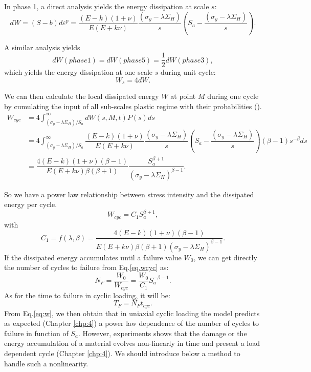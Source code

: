 In phase 1, a direct analysis yields the energy dissipation at scale $s$:
\begin{equation}dW=(S-b)d\varepsilon^p=\dfrac{(E-k)(1+\nu) }{E(E+k\nu)}\dfrac{ \left(\sigma_y-\lambda \Sigma_H\right)}{s}\left(S_{a}-\dfrac{ \left(\sigma_y-\lambda \Sigma_H\right)}{s}\right).
\label{dw}
\end{equation}

A similar analysis yields $$dW(phase 1)=dW(phase 5)=\dfrac{1}{2}dW(phase 3),$$ which yields the energy dissipation at one scale $s$ during unit cycle:
$$W_{s}=4dW.$$

We can then calculate  the local dissipated energy $W$  at point $M$ during one cycle by cumulating the input of all sub-scales plastic regime with their probabilities (\cite{zepeng}).
\begin{equation}
\begin{split}
W_{cyc}&=4\int_{ \left(\sigma_y-\lambda \Sigma_H\right) /S_{a}}^{\infty}dW(s,M,t)P(s)ds
\\&=4\int_{ \left(\sigma_y-\lambda \Sigma_H\right) /S_{a}}^{\infty}\dfrac{(E-k)(1+\nu) }{E(E+k\nu)}\dfrac{ \left(\sigma_y-\lambda \Sigma_H\right)}{s}\left(S_{a}-\dfrac{ \left(\sigma_y-\lambda \Sigma_H\right)}{s}\right)\left( \beta-1\right) s^{-\beta}ds
\\&=\dfrac{4(E-k)(1+\nu)\left( \beta-1\right) }{ E(E+k\nu)\beta\left( \beta+1\right) }\dfrac{S_{a}^{\beta+1}}{ \left(\sigma_y-\lambda \Sigma_H\right)^{\beta-1}}.
\end{split}
\label{eq:w}
\end{equation}

So we have a power law relationship between stress intensity and the dissipated energy per cycle.
\begin{equation}
W_{cyc}=C_1S_{a}^{\beta+1},
\label{eq.wcyc}
\end{equation}
with 
$$C_1=f(\lambda,\beta)=\dfrac{4(E-k)(1+\nu)\left( \beta-1\right) }{ E(E+k\nu)\beta\left( \beta+1\right)\left(\sigma_y-\lambda \Sigma_H\right)^{\beta-1} }.$$
If the dissipated energy accumulates until a failure value $W_0$, we can get directly the number of cycles to failure from Eq.\eqref{eq.wcyc} as:
\begin{equation}
N_{F}=\dfrac{W_0}{W_{cyc}}=\dfrac{W_0}{C_1}S_{a}^{-\beta-1}.
\label{eq.NFcyc}
\end{equation}
As for the time to failure in cyclic loading, it will be:
$$T_{F}=N_{F}t_{cyc}.$$
From Eq.\eqref{eq:w}, we then obtain that in uniaxial cyclic loading the model predicts as expected (Chapter \ref{chp:4}) a power law dependence of the number of cycles to failure in function of $S_{a}$.
However, experiments shows that the damage or the energy accumulation of a material evolves non-linearly in time and present a load dependent cycle (Chapter \ref{chp:4}). We should introduce below a method to handle such a nonlinearity.

